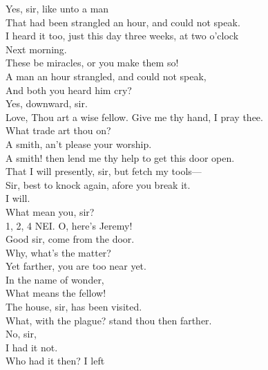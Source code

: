 \documentclass[a4paper,oneside]{memoir}
\begin{document}
\begin{drama*}
\neighsixspeaks {} Yes, sir, like unto a man\\
That had been strangled an hour, and could not speak.\\
\neightwospeaks I heard it too, just this day three weeks, at two o'clock\\
Next morning.\\
\lovewitspeaks {} These be miracles, or you make them so!\\
A man an hour strangled, and could not speak,\\
And both you heard him cry?\\
\neighthreespeaks {} Yes, downward, sir.\\
Love, Thou art a wise fellow. Give me thy hand, I pray thee.\\
What trade art thou on?\\
\neighthreespeaks {} A smith, an't please your worship.\\
\lovewitspeaks A smith! then lend me thy help to get this door open.\\
\neighthreespeaks That I will presently, sir, but fetch my tools---\\
\neighonespeaks Sir, best to knock again, afore you break it.\\
\lovewitspeaks {} I will.\\
\facespeaks What mean you, sir?\\
1, 2, 4 NEI. O, here's Jeremy!\\
\facespeaks {} Good sir, come from the door.\\
\lovewitspeaks Why, what's the matter?\\
\facespeaks {} Yet farther, you are too near yet.\\
\lovewitspeaks In the name of wonder,\\
What means the fellow!\\
\facespeaks {} The house, sir, has been visited.\\
\lovewitspeaks What, with the plague? stand thou then farther.\\
\facespeaks {} No, sir,\\
I had it not.\\
\lovewitspeaks {} Who had it then? I left\\

\end{drama*}
\end{document}

